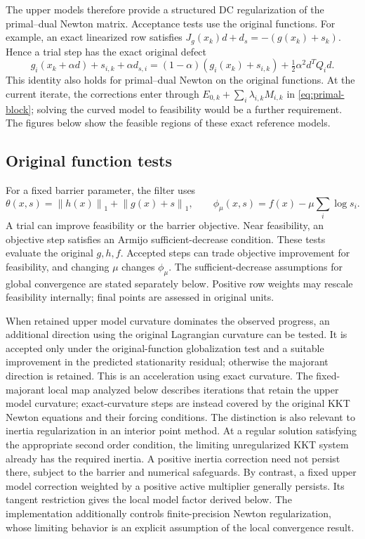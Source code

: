 \documentclass[pdflatex,sn-mathphys-num]{sn-jnl}
\theoremstyle{thmstyleone}
\theoremstyle{thmstylethree}
\newcommand{\norm}[1]{\left\lVert#1\right\rVert}
\begin{document}
The upper models therefore provide a structured DC regularization of
the primal--dual Newton matrix. Acceptance tests use the original functions.
For example, an exact linearized row satisfies
$J_g(x_k)d+d_s=-(g(x_k)+s_k)$. Hence a trial step has the exact original
defect
\begin{equation}\label{eq:one-step-primal-defect}
 g_i(x_k+\alpha d)+s_{i,k}+\alpha d_{s,i}
 =(1-\alpha)(g_i(x_k)+s_{i,k})
       +\tfrac12\alpha^2d^TQ_id.
\end{equation}
This identity also holds for primal--dual Newton on the original functions. At the current iterate, the corrections enter
through $E_{0,k}+\sum_i\lambda_{i,k}M_{i,k}$ in
\eqref{eq:primal-block}; solving the curved model to feasibility would
be a further requirement. The figures below show the feasible regions of these exact reference models.



\subsection{Original function tests}
For a fixed barrier parameter, the filter uses
\[
 \theta(x,s)=\norm{h(x)}_1+\norm{g(x)+s}_1,
 \qquad \phi_\mu(x,s)=f(x)-\mu\sum_i\log s_i.
\]
A trial can improve feasibility or the barrier objective. Near
feasibility, an objective step satisfies an Armijo sufficient-decrease
condition. These tests evaluate the original $g,h,f$. Accepted
steps can trade objective improvement for feasibility, and changing
$\mu$ changes $\phi_\mu$. The sufficient-decrease assumptions for
global convergence are stated separately below. Positive row weights
may rescale feasibility internally; final points are assessed in original
units.

When retained upper model curvature dominates the observed progress,
an additional direction using the original Lagrangian curvature can be
tested. It is accepted only under the original-function globalization
test and a suitable improvement in the predicted stationarity residual;
otherwise the majorant direction is retained. This is an
acceleration using exact curvature. The fixed-majorant local map analyzed
below describes iterations that retain the upper model curvature;
exact-curvature steps are instead covered by the original KKT Newton
equations and their forcing conditions. The distinction is also relevant
to inertia regularization in an interior point method. At a regular
solution satisfying the appropriate second order condition, the limiting
unregularized KKT system already has the required inertia. A positive
inertia correction need not persist there, subject to the barrier and
numerical safeguards. By contrast, a fixed upper model correction
weighted by a positive active multiplier generally persists. Its tangent restriction gives the local model factor derived below.
The implementation additionally controls finite-precision Newton
regularization, whose limiting behavior is an explicit assumption of
the local convergence result.
\end{document}
